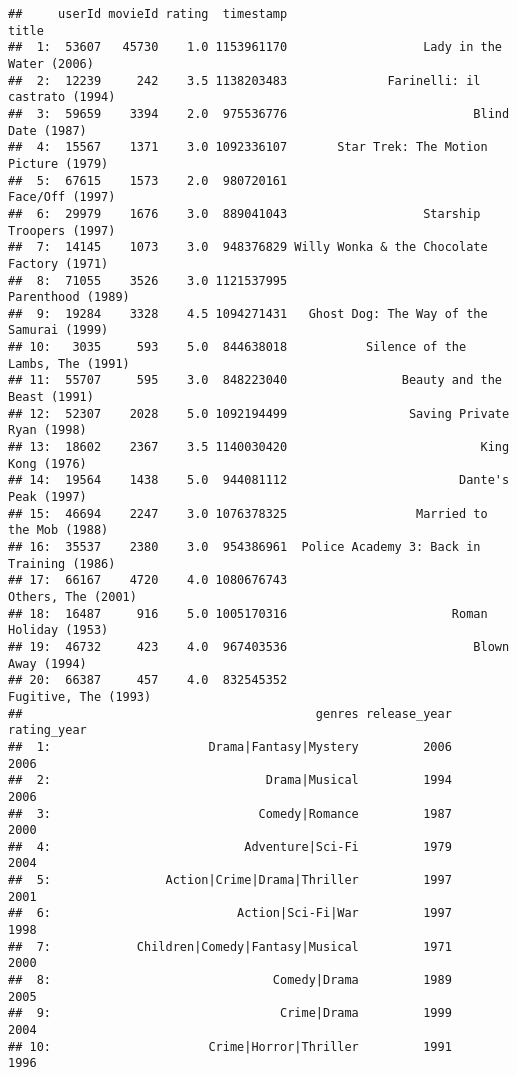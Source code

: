 \documentclass[
]{article}
\begin{document}
\begin{verbatim}
##     userId movieId rating  timestamp                                      title
##  1:  53607   45730    1.0 1153961170                   Lady in the Water (2006)
##  2:  12239     242    3.5 1138203483              Farinelli: il castrato (1994)
##  3:  59659    3394    2.0  975536776                          Blind Date (1987)
##  4:  15567    1371    3.0 1092336107       Star Trek: The Motion Picture (1979)
##  5:  67615    1573    2.0  980720161                            Face/Off (1997)
##  6:  29979    1676    3.0  889041043                   Starship Troopers (1997)
##  7:  14145    1073    3.0  948376829 Willy Wonka & the Chocolate Factory (1971)
##  8:  71055    3526    3.0 1121537995                          Parenthood (1989)
##  9:  19284    3328    4.5 1094271431   Ghost Dog: The Way of the Samurai (1999)
## 10:   3035     593    5.0  844638018           Silence of the Lambs, The (1991)
## 11:  55707     595    3.0  848223040                Beauty and the Beast (1991)
## 12:  52307    2028    5.0 1092194499                 Saving Private Ryan (1998)
## 13:  18602    2367    3.5 1140030420                           King Kong (1976)
## 14:  19564    1438    5.0  944081112                        Dante's Peak (1997)
## 15:  46694    2247    3.0 1076378325                  Married to the Mob (1988)
## 16:  35537    2380    3.0  954386961  Police Academy 3: Back in Training (1986)
## 17:  66167    4720    4.0 1080676743                         Others, The (2001)
## 18:  16487     916    5.0 1005170316                       Roman Holiday (1953)
## 19:  46732     423    4.0  967403536                          Blown Away (1994)
## 20:  66387     457    4.0  832545352                       Fugitive, The (1993)
##                                         genres release_year rating_year
##  1:                      Drama|Fantasy|Mystery         2006        2006
##  2:                              Drama|Musical         1994        2006
##  3:                             Comedy|Romance         1987        2000
##  4:                           Adventure|Sci-Fi         1979        2004
##  5:                Action|Crime|Drama|Thriller         1997        2001
##  6:                          Action|Sci-Fi|War         1997        1998
##  7:            Children|Comedy|Fantasy|Musical         1971        2000
##  8:                               Comedy|Drama         1989        2005
##  9:                                Crime|Drama         1999        2004
## 10:                      Crime|Horror|Thriller         1991        1996

\end{verbatim}
\end{document}
